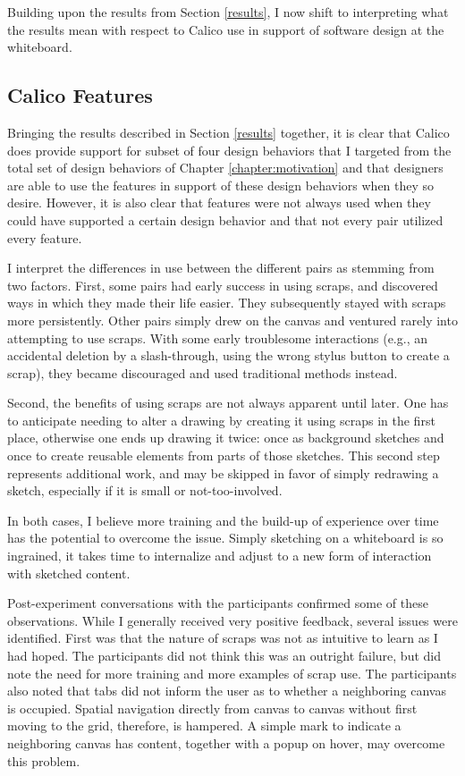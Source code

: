 \documentclass[12pt,fleqn]{ucithesis}
\begin{document}
Building upon the results from Section \ref{results}, I now shift to interpreting what the results mean with respect to Calico use in support of software design at the whiteboard.

\subsection {Calico Features}
\label{discussion:1}

Bringing the results described in Section \ref{results} together, it is clear that Calico does provide support for subset of four design behaviors that I targeted from the total set of design behaviors of Chapter \ref{chapter:motivation} and that designers are able to use the features in support of these design behaviors when they so desire. However, it is also clear that features were not always used when they could have supported a certain design behavior and that not every pair utilized every feature.

I interpret the differences in use between the different pairs as stemming from two factors. First, some pairs had early success in using scraps, and discovered ways in which they made their life easier. They subsequently stayed with scraps more persistently. Other pairs simply drew on the canvas and ventured rarely into attempting to use scraps. With some early troublesome interactions (e.g., an accidental deletion by a slash-through, using the wrong stylus button to create a scrap), they became discouraged and used traditional methods instead. 

Second, the benefits of using scraps are not always apparent until later. One has to anticipate needing to alter a drawing by creating it using scraps in the first place, otherwise one ends up drawing it twice: once as background sketches and once to create reusable elements from parts of those sketches. This second step represents additional work, and may be skipped in favor of simply redrawing a sketch, especially if it is small or not-too-involved. 

In both cases, I believe more training and the build-up of experience over time has the potential to overcome the issue. Simply sketching on a whiteboard is so ingrained, it takes time to internalize and adjust to a new form of interaction with sketched content. 

Post-experiment conversations with the participants confirmed some of these observations. While I generally received very positive feedback, several issues were identified. First was that the nature of scraps was not as intuitive to learn as I had hoped. The participants did not think this was an outright failure, but did note the need for more training and more examples of scrap use. The participants also noted that tabs did not inform the user as to whether a neighboring canvas is occupied. Spatial navigation directly from canvas to canvas without first moving to the grid, therefore, is hampered. A simple mark to indicate a neighboring canvas has content, together with a popup on hover, may overcome this problem. 
\end{document}
